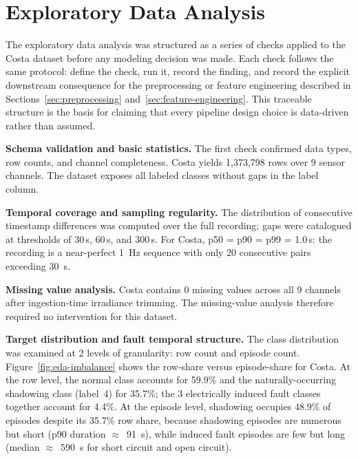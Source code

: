 \section{Exploratory Data Analysis}
\label{sec:eda}

The exploratory data analysis was structured as a series of checks applied to the Costa dataset before any modeling decision was made. Each check follows the same protocol: define the check, run it, record the finding, and record the explicit downstream consequence for the preprocessing or feature engineering described in Sections~\ref{sec:preprocessing} and~\ref{sec:feature-engineering}. This traceable structure is the basis for claiming that every pipeline design choice is data-driven rather than assumed.

\textbf{Schema validation and basic statistics.} The first check confirmed data types, row counts, and channel completeness. Costa yields 1,373,798 rows over 9 sensor channels. The dataset exposes all labeled classes without gaps in the label column.

\textbf{Temporal coverage and sampling regularity.} The distribution of consecutive timestamp differences was computed over the full recording; gaps were catalogued at thresholds of 30\,s, 60\,s, and 300\,s. For Costa, p50 = p90 = p99 = 1.0\,s: the recording is a near-perfect 1~Hz sequence with only 20 consecutive pairs exceeding 30~s.


\textbf{Missing value analysis.} Costa contains 0 missing values across all 9 channels after ingestion-time irradiance trimming. The missing-value analysis therefore required no intervention for this dataset.

\textbf{Target distribution and fault temporal structure.} The class distribution was examined at 2 levels of granularity: row count and episode count. Figure~\ref{fig:eda-imbalance} shows the row-share versus episode-share for Costa. At the row level, the normal class accounts for 59.9\% and the naturally-occurring shadowing class (label~4) for 35.7\%; the 3 electrically induced fault classes together account for 4.4\%. At the episode level, shadowing occupies 48.9\% of episodes despite its 35.7\% row share, because shadowing episodes are numerous but short (p90 duration $\approx$~91~s), while induced fault episodes are few but long (median $\approx$~590~s for short circuit and open circuit).

